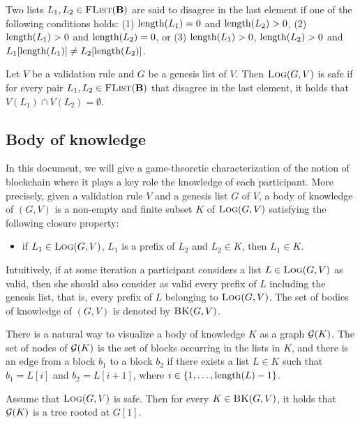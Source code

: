 Two lists $L_1, L_2 \in \text{\sc FList}(\text{\bf B})$ are said to disagree in the last element if one of the following conditions holds: (1) $\text{\rm length}(L_1) = 0$ and $\text{\rm length}(L_2) > 0$, (2) $\text{\rm length}(L_1) > 0$ and $\text{\rm length}(L_2) = 0$, or (3) $\text{\rm length}(L_1) > 0$, $\text{\rm length}(L_2) > 0$ and $L_1[\text{\rm length}(L_1)] \neq L_2[\text{\rm length}(L_2)]$.
\begin{mydef}
	Let $V$ be a validation rule and $G$ be a genesis list of $V$. Then $\text{\sc Log}(G,V)$ is safe if for every pair $L_1, L_2 \in \text{\sc FList}(\text{\bf B})$ that disagree in the last element, it holds that $V(L_1) \cap V(L_2) = \emptyset$.
\end{mydef}


\subsection{Body of knowledge}

In this document,  we will give a game-theoretic characterization of the notion of blockchain where it plays a key role the knowledge of each participant. More precisely, given a validation rule $V$ and a genesis list $G$ of $V$, a body of knowledge of $(G,V)$ is a non-empty and finite subset $K$ of $\text{\sc Log}(G,V)$ satisfying the following closure property:
\begin{itemize}
\item if $L_1 \in \text{\sc Log}(G,V)$, $L_1$ is a prefix of $L_2$ and $L_2 \in K$, then $L_1 \in K$.
\end{itemize}
Intuitively, if at some iteration a participant considers a list $L \in \text{\sc Log}(G,V)$ as valid, then she should also consider as valid every prefix of $L$ including the genesis list, that is, every prefix of $L$ belonging to $\text{\sc Log}(G,V)$. The set of bodies of knowledge of $(G,V)$ is denoted by $\text{\sc BK}(G,V)$. 

There is a natural way to  visualize a body of knowledge $K$ as a graph $\mathcal{G}(K)$. The set of nodes of $\mathcal{G}(K)$ is the set of blocks occurring in the lists in $K$, and there is an edge from a block $b_1$ to a block $b_2$ if there exists a list $L \in K$ such that $b_1 = L[i]$ and $b_2 = L[i+1]$, where $i \in \{1, \ldots, \text{\rm length}(L) -1\}$.
\begin{mylem}
	Assume that $\text{\sc Log}(G,V)$ is safe. Then for every $K \in \text{\sc BK}(G,V)$, it holds that $\mathcal{G}(K)$ is a tree rooted at $G[1]$.
\end{mylem}

%

